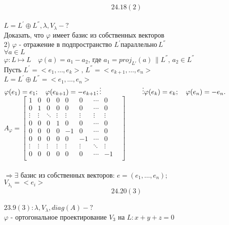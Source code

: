 \documentclass[a4paper,12pt]{report}
\begin{document}
$$24.18(2)$$
\\$L = L^{'} \oplus L^{''}, \lambda, V_{\lambda} - ?$
\\Доказать, что $\varphi$ имеет базис из собственных векторов
\\2) $\varphi$ - отражение в подпространство $L^{'}  параллельно \, L^{''}$
\\$\forall a \in L$
\\$\varphi: L \longmapsto L \quad \varphi(a) = a_{1} - a_{2}$, где $a_{1} = \textit{proj}_{L'}(a) \, \| L^{''}$, 
$a_{2} \in L^{''}$
\\Пусть $L^{'} = <e_{1}, \dots, e_{k}>, \, L^{''} = <e_{k+1}, \dots, e_{n}>$
\\$L = L^{'} \oplus L^{''} = <e_{1}, \dots, e_{n}>$
\\$\varphi(e_{1}) = e_{1}; \quad \varphi(e_{k+1}) = -e_{k+1};
\\\vdots \qquad \qquad \qquad  \vdots
\\\varphi(e_{k}) = e_{k};	\quad \varphi(e_{n}) = -e_{n}. $
\\
$A_{\varphi} = \begin{bmatrix}

1 & 0 & 0 & 0 & 0 & 0 &\cdots & 0\\

0 & 1 & 0 & 0 & 0 & 0 &\cdots & 0\\

\vdots & \vdots & \ddots & \vdots  & \vdots & \vdots & \vdots & \vdots  \\

0 & 0 & 0 & 1 & 0 & 0 &\cdots & 0\\
0 & 0 & 0 & 0 & -1 &0 & \cdots & 0\\
0 & 0 & 0 & 0 & 0 & -1 &\cdots & 0\\

\vdots & \vdots & \vdots & \vdots & \vdots &\vdots & \ddots & \vdots &\\

0 & 0 & 0 & 0 & 0 & 0 &\cdots & -1\\

\end{bmatrix}$
\\
\\ $\Longrightarrow \exists$ базис из собственных векторов: $e = (e_{1}, \dots, e_{n});$
\\$V_{\lambda_{i}} = <e_{i}>$
$$24.20(3)$$
\\$23.9(3) :\lambda, V_{\lambda}, \textit{diag}(A) - ?$
\\$\varphi$ - ортогональное проектирование $V_{3}$ на $L: x+y+z = 0$
\end{document}
